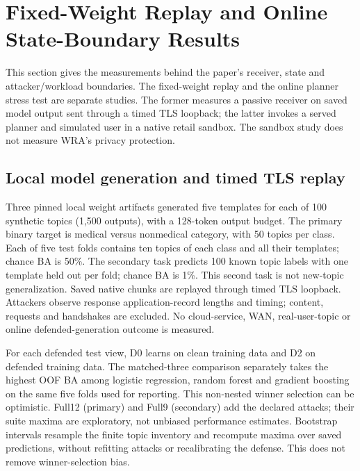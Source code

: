 \section{Fixed-Weight Replay and Online State-Boundary Results}\label{sec:r42-r44-verified}

This section gives the measurements behind the paper's receiver, state and
attacker/workload boundaries. The fixed-weight replay and the online planner
stress test are separate studies. The former measures a passive receiver on
saved model output sent through a timed TLS loopback; the latter invokes a
served planner and simulated user in a native retail sandbox. The sandbox
study does not measure WRA's privacy protection.

\subsection{Local model generation and timed TLS replay}
Three pinned local weight artifacts generated five templates for each of 100 synthetic topics (1,500 outputs), with a 128-token output budget. The primary binary target is medical versus nonmedical category, with 50 topics per class. Each of five test folds contains ten topics of each class and all their templates; chance BA is 50\%. The secondary task predicts 100 known topic labels with one template held out per fold; chance BA is 1\%. This second task is not new-topic generalization. Saved native chunks are replayed through timed TLS loopback. Attackers observe response application-record lengths and timing; content, requests and handshakes are excluded. No cloud-service, WAN, real-user-topic or online defended-generation outcome is measured.

For each defended test view, D0 learns on clean training data and D2 on defended training data. The matched-three comparison separately takes the highest OOF BA among logistic regression, random forest and gradient boosting on the same five folds used for reporting. This non-nested winner selection can be optimistic. Full12 (primary) and Full9 (secondary) add the declared attacks; their suite maxima are exploratory, not unbiased performance estimates. Bootstrap intervals resample the finite topic inventory and recompute maxima over saved predictions, without refitting attacks or recalibrating the defense. This does not remove winner-selection bias.

